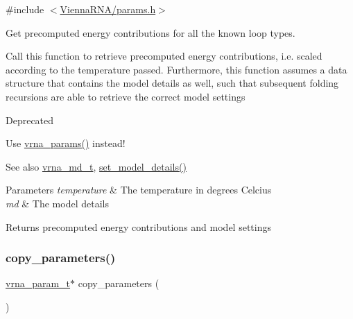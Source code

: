 {\ttfamily \#include $<$\mbox{\hyperlink{params_8h}{Vienna\+R\+N\+A/params.\+h}}$>$}



Get precomputed energy contributions for all the known loop types. 

Call this function to retrieve precomputed energy contributions, i.\+e. scaled according to the temperature passed. Furthermore, this function assumes a data structure that contains the model details as well, such that subsequent folding recursions are able to retrieve the correct model settings

\begin{DoxyRefDesc}{Deprecated}
\item[\mbox{\hyperlink{deprecated__deprecated000100}{Deprecated}}]Use \mbox{\hyperlink{group__energy__parameters_gad0e3e7e74bdc50d1709d40c92993185e}{vrna\+\_\+params()}} instead!\end{DoxyRefDesc}


\begin{DoxySeeAlso}{See also}
\mbox{\hyperlink{group__model__details_ga1f8a10e12a0a1915f2a4eff0b28ea17c}{vrna\+\_\+md\+\_\+t}}, \mbox{\hyperlink{group__model__details_gabad896c3650d420f3f3ddefc69e2bceb}{set\+\_\+model\+\_\+details()}}
\end{DoxySeeAlso}

\begin{DoxyParams}{Parameters}
{\em temperature} & The temperature in degrees Celcius \\
\hline
{\em md} & The model details \\
\hline
\end{DoxyParams}
\begin{DoxyReturn}{Returns}
precomputed energy contributions and model settings 
\end{DoxyReturn}
\mbox{\label{group__energy__parameters_gac2f6521f9db04ede2f23fc56cc9fa7e5}} 
\subsubsection{\texorpdfstring{copy\+\_\+parameters()}{copy\_parameters()}}
{\footnotesize\ttfamily \mbox{\hyperlink{group__energy__parameters_ga8a69ca7d787e4fd6079914f5343a1f35}{vrna\+\_\+param\+\_\+t}}$\ast$ copy\+\_\+parameters (\begin{DoxyParamCaption}\item[{void}]{ }\end{DoxyParamCaption})}




